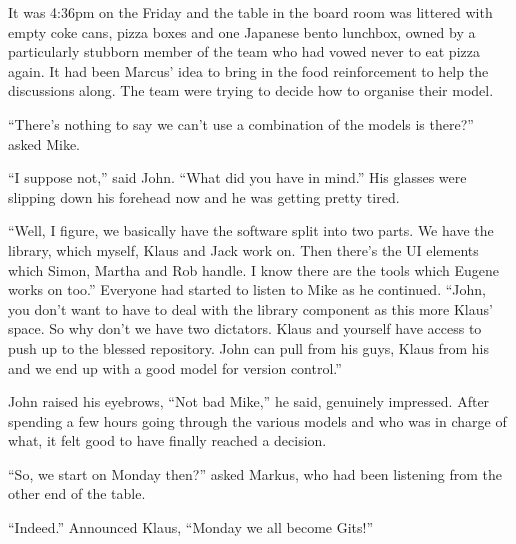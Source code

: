 \begin{trenches}
It was 4:36pm on the Friday and the table in the board room was littered with empty coke cans, pizza boxes and one Japanese bento lunchbox, owned by a particularly stubborn member of the team who had vowed never to eat pizza again.
It had been Marcus' idea to bring in the food reinforcement to help the discussions along.
The team were trying to decide how to organise their model.

``There's nothing to say we can't use a combination of the models is there?'' asked Mike.

``I suppose not,'' said John.
``What did you have in mind.'' His glasses were slipping down his forehead now and he was getting pretty tired.

``Well, I figure, we basically have the software split into two parts. We have the library, which myself, Klaus and Jack work on. Then there's the UI elements which Simon, Martha and Rob handle. I know there are the tools which Eugene works on too.''
Everyone had started to listen to Mike as he continued.
``John, you don't want to have to deal with the library component as this more Klaus' space. So why don't we have two dictators. Klaus and yourself have access to push up to the blessed repository. John can pull from his guys, Klaus from his and we end up with a good model for version control.''

John raised his eyebrows, ``Not bad Mike,'' he said, genuinely impressed.
After spending a few hours going through the various models and who was in charge of what, it felt good to have finally reached a decision.

``So, we start on Monday then?'' asked Markus, who had been listening from the other end of the table.

``Indeed.'' Announced Klaus, ``Monday we all become Gits!''
\end{trenches}
